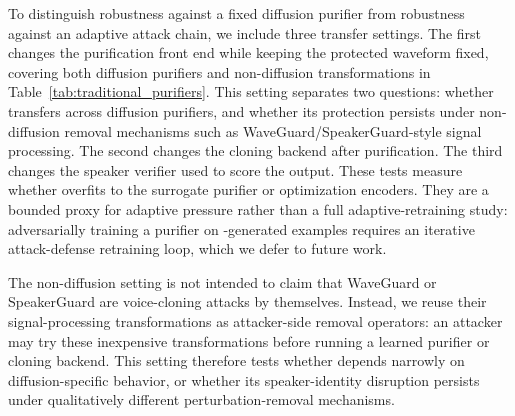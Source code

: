 To distinguish robustness against a fixed diffusion purifier from robustness against an adaptive attack chain, we include three transfer settings. 
The first changes the purification front end while keeping the protected waveform fixed, covering both diffusion purifiers and non-diffusion transformations in Table~\ref{tab:traditional_purifiers}. 
This setting separates two questions: whether \method{} transfers across diffusion purifiers, and whether its protection persists under non-diffusion removal mechanisms such as WaveGuard/SpeakerGuard-style signal processing. 
The second changes the cloning backend after purification. The third changes the speaker verifier used to score the output. 
These tests measure whether \method{} overfits to the surrogate purifier or optimization encoders.
They are a bounded proxy for adaptive pressure rather than a full adaptive-retraining study: 
adversarially training a purifier on \method-generated examples requires an iterative attack-defense retraining loop, which we defer to future work.

The non-diffusion setting is not intended to claim that WaveGuard or SpeakerGuard are voice-cloning attacks by themselves. 
Instead, we reuse their signal-processing transformations as attacker-side removal operators: an attacker may try these inexpensive transformations before running a learned purifier or cloning backend. 
This setting therefore tests whether \method{} depends narrowly on diffusion-specific behavior, or whether its speaker-identity disruption persists under qualitatively different perturbation-removal mechanisms.

